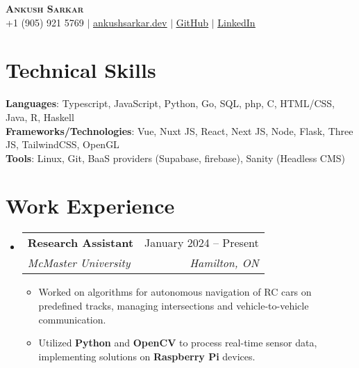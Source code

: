 \documentclass[a4paper,10pt]{article}
\makeatletter
\newcommand{\resumeSubheading}[4]{
  \vspace{-1pt}\item
    \begin{tabular*}{0.97\textwidth}[t]{l@{\extracolsep{\fill}}r}
      \textbf{#1} & #2 \\
      \textit{\normalsize#3} & \textit{\normalsize #4} \\
    \end{tabular*}\vspace{-7pt}
}
\newcommand{\resumeSubHeadingListStart}{\begin{itemize}[leftmargin=0.15in, label={}]}
\newcommand{\resumeSubHeadingListEnd}{\end{itemize}}
\makeatother
\begin{document}

\begin{center}
  \textbf{\Huge \scshape Ankush Sarkar} \\ \vspace{1pt}
  \small +1 (905) 921 5769 $|$ \href{https://www.ankushsarkar.dev/}{\underline{ankushsarkar.dev}} $|$
  \href{https://github.com/AnkushSarkar10}{\underline{GitHub}} $|$
  \href{https://www.linkedin.com/in/ankush-sarkar-a55a5b213/}{\underline{LinkedIn}}
\end{center}

%
\section{Technical Skills}
\begin{itemize}[leftmargin=0.15in, label={}]
  {\item{
                \textbf{Languages}{: Typescript, JavaScript, Python, Go, SQL, php, C, HTML/CSS, Java, R, Haskell} \\
                \textbf{Frameworks/Technologies}{: Vue, Nuxt JS, React, Next JS, Node, Flask, Three JS, TailwindCSS, OpenGL} \\
                \textbf{Tools}{: Linux, Git, BaaS providers (Supabase, firebase), Sanity (Headless CMS)}
          }}
\end{itemize}


\vspace{-15pt}
\section{Work Experience}
\resumeSubHeadingListStart
\resumeSubheading
{Research Assistant}{January 2024 -- Present}
{McMaster University}{Hamilton, ON}
\begin{itemize}[leftmargin=0.15in]
  \item Worked on algorithms for autonomous navigation of RC cars on predefined tracks, managing intersections and vehicle-to-vehicle communication.
  \item Utilized \textbf{Python} and \textbf{OpenCV} to process real-time sensor data, implementing solutions on \textbf{Raspberry Pi} devices.
\end{itemize}
\resumeSubHeadingListEnd
\end{document}
